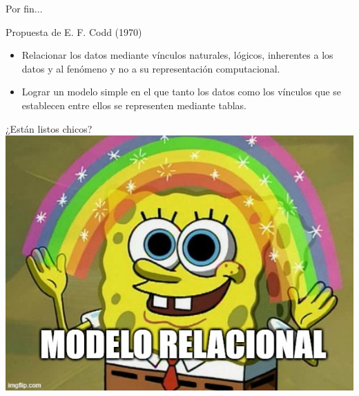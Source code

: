 \begin{frame}{Por fin...}
    \begin{block}{Propuesta de E. F. Codd (1970)}
        \begin{itemize}
            \item Relacionar los datos mediante v\'inculos
            naturales, l\'ogicos, inherentes a los datos y al fen\'omeno y no
            a su representaci\'on computacional. 
            \item Lograr un modelo simple en el que tanto los datos
            como los v\'inculos que se establecen entre ellos se representen
            mediante tablas.
        \end{itemize}
        
    \end{block}
\end{frame}


\begin{frame}{¿Est\'an listos chicos?}
    \includegraphics[width=\linewidth, height=0.85\textheight]{img/relational_model.jpg}
\end{frame}